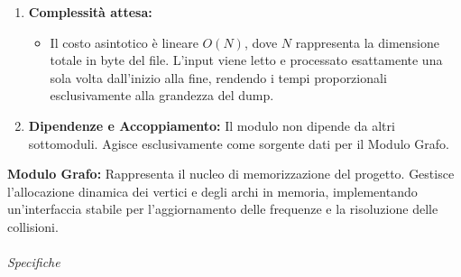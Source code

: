 \documentclass[12pt, a4paper]{article}
\begin{document}
\begin{enumerate}
\begin{itemize}
        \item[-] \texttt{<algorithm>}: Fornisce un vastissimo set di algoritmi matematici e di utilità fortemente ottimizzati per le prestazioni. Nel modulo è stata inclusa unicamente per poter invocare \texttt{replace}, che consente di sostituire tutti i caratteri \texttt{|} con spazi bianchi alterando la stringa direttamente sul posto, senza dover creare copie aggiuntive in memoria.
    \end{itemize}
    \item \textbf{Complessità attesa:} 
    \begin{itemize}
        \item[-] Il costo asintotico è lineare $O(N)$, dove $N$ rappresenta la dimensione totale in byte del file. L'input viene letto e processato esattamente una sola volta dall'inizio alla fine, rendendo i tempi proporzionali esclusivamente alla grandezza del dump.
    \end{itemize}
    \item \textbf{Dipendenze e Accoppiamento:} Il modulo non dipende da altri sottomoduli. Agisce esclusivamente come sorgente dati per il Modulo Grafo. 
\end{enumerate}
{\large\textbf{Modulo Grafo:}} Rappresenta il nucleo di memorizzazione del progetto. Gestisce l'allocazione dinamica dei vertici e degli archi in memoria, implementando un'interfaccia stabile per l'aggiornamento delle frequenze e la risoluzione delle collisioni. \\ \\
{\large \textit{Specifiche}}
\end{document}
